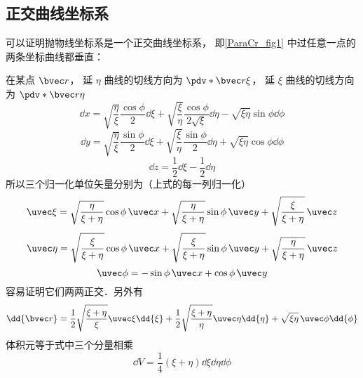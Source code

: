 \subsection{正交曲线坐标系}
可以证明抛物线坐标系是一个正交曲线坐标系， 即\autoref{ParaCr_fig1} 中过任意一点的两条坐标曲线都垂直：

在某点 $\bvec r$， 延 $\eta$ 曲线的切线方向为 $\pdv*{\bvec r}{\xi}$， 延 $\xi$ 曲线的切线方向为 $\pdv*{\bvec r}{\eta}$
\begin{equation}
\dd{x} = \sqrt{\frac{\eta}{\xi}}\frac{\cos\phi}{2}\dd{\xi} + \sqrt{\frac{\xi}{\eta}}\frac{\cos\phi}{2\sqrt{\xi}}\dd{\eta} - \sqrt{\xi\eta}\sin\phi\dd{\phi}
\end{equation}
\begin{equation}
\dd{y} = \sqrt{\frac{\eta}{\xi}}\frac{\sin\phi}{2}\dd{\xi} + \sqrt{\frac{\xi}{\eta}}\frac{\sin\phi}{2}\dd{\eta} + \sqrt{\xi\eta}\cos\phi\dd{\phi}
\end{equation}
\begin{equation}
\dd{z} = \frac{1}{2}\dd{\xi} - \frac{1}{2}\dd{\eta}
\end{equation}
所以三个归一化单位矢量分别为（上式的每一列归一化）
\begin{equation}
\uvec \xi = \sqrt{\frac{\eta}{\xi+\eta}}\cos\phi\,\uvec x + \sqrt{\frac{\eta}{\xi+\eta}}\sin\phi\,\uvec y + \sqrt{\frac{\xi}{\xi+\eta}}\,\uvec z
\end{equation}
\begin{equation}
\uvec \eta = \sqrt{\frac{\xi}{\xi+\eta}}\cos\phi\,\uvec x + \sqrt{\frac{\xi}{\xi+\eta}}\sin\phi\,\uvec y + \sqrt{\frac{\eta}{\xi+\eta}}\,\uvec z
\end{equation}
\begin{equation}
\uvec \phi = -\sin\phi \,\uvec x + \cos\phi \,\uvec y
\end{equation}
容易证明它们两两正交．另外有
\begin{equation}\label{ParaCr_eq4}
\dd{\bvec r} = \frac{1}{2}\sqrt{\frac{\xi + \eta}{\xi}} \uvec \xi \dd{\xi}
+ \frac{1}{2}\sqrt{\frac{\xi + \eta}{\eta}} \uvec \eta \dd{\eta}
+ \sqrt{\xi\eta}\, \uvec \phi \dd{\phi}
\end{equation}
体积元等于式中三个分量相乘
\begin{equation}
\dd{V} = \frac{1}{4} (\xi + \eta) \dd{\xi}\dd{\eta}\dd{\phi}
\end{equation}

